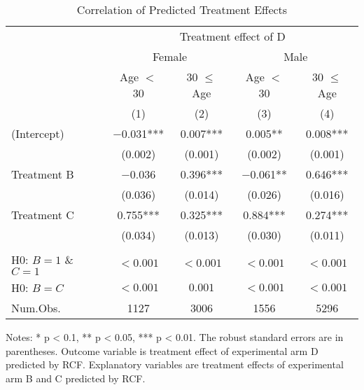 \documentclass[12pt, a4paper]{article}
\begin{document}
\begin{table}

\caption{\label{tab:rcf-int-corr}Correlation of Predicted Treatment Effects}
\centering
\fontsize{9}{11}\selectfont
\begin{threeparttable}
\begin{tabular}[t]{lcccc}
\toprule
\multicolumn{1}{c}{ } & \multicolumn{4}{c}{Treatment effect of D} \\
\cmidrule(l{3pt}r{3pt}){2-5}
\multicolumn{1}{c}{ } & \multicolumn{2}{c}{Female} & \multicolumn{2}{c}{Male} \\
\cmidrule(l{3pt}r{3pt}){2-3} \cmidrule(l{3pt}r{3pt}){4-5}
\multicolumn{1}{c}{ } & \multicolumn{1}{c}{Age $<$ 30} & \multicolumn{1}{c}{30 $\le$ Age} & \multicolumn{1}{c}{Age $<$ 30} & \multicolumn{1}{c}{30 $\le$ Age} \\
\cmidrule(l{3pt}r{3pt}){2-2} \cmidrule(l{3pt}r{3pt}){3-3} \cmidrule(l{3pt}r{3pt}){4-4} \cmidrule(l{3pt}r{3pt}){5-5}
  & (1) & (2) & (3) & (4)\\
\midrule
(Intercept) & \num{-0.031}*** & \num{0.007}*** & \num{0.005}** & \num{0.008}***\\
 & (\num{0.002}) & (\num{0.001}) & (\num{0.002}) & (\num{0.001})\\
Treatment B & \num{-0.036} & \num{0.396}*** & \num{-0.061}** & \num{0.646}***\\
 & (\num{0.036}) & (\num{0.014}) & (\num{0.026}) & (\num{0.016})\\
Treatment C & \num{0.755}*** & \num{0.325}*** & \num{0.884}*** & \num{0.274}***\\
 & (\num{0.034}) & (\num{0.013}) & (\num{0.030}) & (\num{0.011})\\
\midrule
\addlinespace[0.3em]
\multicolumn{5}{l}{\textit{F-test, p-value}}\\
\hspace{1em}H0: $B = 1$ \& $C = 1$ & $< 0.001$ & $< 0.001$ & $< 0.001$ & $< 0.001$\\
\hspace{1em}H0: $B = C$ & $< 0.001$ & $0.001$ & $< 0.001$ & $< 0.001$\\
Num.Obs. & \num{1127} & \num{3006} & \num{1556} & \num{5296}\\
\bottomrule
\end{tabular}
\begin{tablenotes}
\item Notes: * p < 0.1, ** p < 0.05, *** p < 0.01. The robust standard errors are in parentheses. Outcome variable is treatment effect of experimental arm D predicted by RCF. Explanatory variables are treatment effects of experimental arm B and C predicted by RCF.
\end{tablenotes}
\end{threeparttable}
\end{table}
\end{document}
